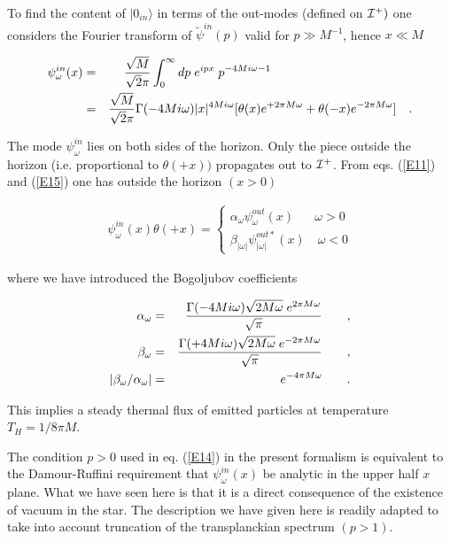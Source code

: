 \documentclass[12pt]{article}
\begin{document}
To find the content of $ \vert{ 0_{in}}\rangle$ in terms of the out-modes (defined on $
{\cal I}^+)$ one considers the Fourier transform of $ {\tilde{\psi}}^{in} (p)$
valid for $ p \gg M^{-1}$, hence $ x \ll M$

\begin{eqnarray}
\psi_\omega^{in} (x) &=& {\sqrt{M} \over \sqrt{2} \pi}
 \int^{\infty}_{0} {d p } \; e^{i p x}
\; p^{-4 M i \omega - 1} \hspace{4cm} \nonumber\\
&=& {\sqrt{M} \over \sqrt{2} \pi}{\Gamma (-4 M i \omega) } \vert x  \vert^{4 M i
\omega} [ \theta (x) e^{+ 2 \pi M \omega} + \theta (-x) e^{-2 \pi M \omega} ]
\quad . \label {E15} 
\end{eqnarray}



\noindent The mode $ \psi_\omega ^{in}$ lies on both sides of the horizon. Only
the piece outside the horizon (i.e. proportional to $ \theta (+x))$ propagates
out to $ {\cal I}^+$. From eqs. (\ref{E11}) and (\ref{E15}) one has outside the
horizon $ (x > 0)$

\begin{eqnarray}
 \psi_\omega ^{in} (x) \theta (+ x) = \left\{ \begin{array}{ll}
\alpha_{\omega} \psi_\omega^{out} (x) \quad \mbox{ $\omega
> 0$}\\
\beta_{\vert \omega \vert} \psi_{\vert
\omega \vert}^{out *}(x) \quad \mbox{$\omega < 0$}
\end{array}
\right.   \label {E16}
\end{eqnarray}

\noindent 
where we have introduced the Bogoljubov coefficients

\begin{eqnarray}
\alpha _\omega &=& {\Gamma (- 4 M i \omega) \sqrt{2 M \omega}\; e^{2 \pi M \omega}
\over \sqrt{ \pi}} \qquad ,\nonumber \\
\beta_\omega &=& {\Gamma (+4 M i \omega) \sqrt{2 M \omega}\; e^{-2 \pi M
\omega} \over \sqrt { \pi}}\qquad ,   \nonumber\\
\vert \beta_\omega / \alpha_\omega \vert &=& e^{-4 \pi M \omega} \qquad .
\label {E17}
\end{eqnarray}



\noindent This implies a steady 
thermal flux of emitted particles at temperature $ T_H
= 1 / 8 \pi M$.

 The
condition $p>0$ used in  eq. (\ref{E14}) 
in the present formalism is equivalent
to the Damour-Ruffini requirement that $ \psi_\omega^{in} (x)$ be analytic in the upper
half $x$ plane. What we have seen here is that it is a direct consequence of the
existence of vacuum in the star. The description we have given here is
readily adapted to take into account truncation of the transplanckian spectrum
$(p > 1)$.
\end{document}
